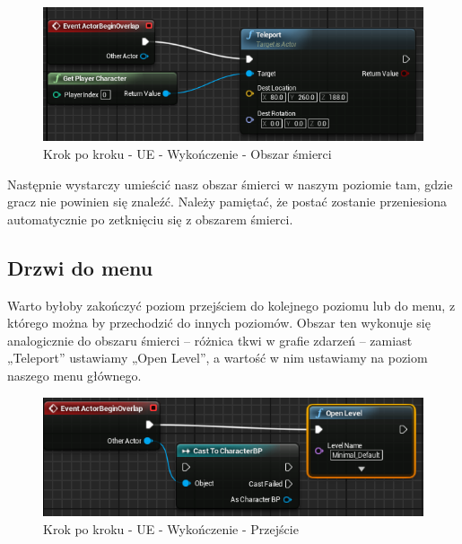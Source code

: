 \documentclass[12pt]{xmgr}
\begin{document}
\begin{figure}[!htb]
    \begin{center}
    \includegraphics[scale=0.5]{Screeny/UeKrokPoKroku/LevelGraph}
    \end{center}
    \caption{Krok po kroku - UE - Wykończenie - Obszar śmierci }
\end{figure}

Następnie wystarczy umieścić nasz obszar śmierci w naszym poziomie tam, gdzie gracz nie powinien się znaleźć. Należy pamiętać, że postać zostanie przeniesiona automatycznie po zetknięciu się z obszarem śmierci.

\subsection{Drzwi do menu}

Warto byłoby zakończyć poziom przejściem do kolejnego poziomu lub do menu, z którego można by przechodzić do innych poziomów. Obszar ten wykonuje się analogicznie do obszaru śmierci – różnica tkwi w grafie zdarzeń – zamiast „Teleport” ustawiamy „Open Level”, a wartość w nim ustawiamy na poziom naszego menu głównego.

\begin{figure}[!htb]
    \begin{center}
    \includegraphics[scale=0.5]{Screeny/UeKrokPoKroku/Door}
    \end{center}
    \caption{Krok po kroku - UE - Wykończenie - Przejście}
\end{figure}
\end{document}
